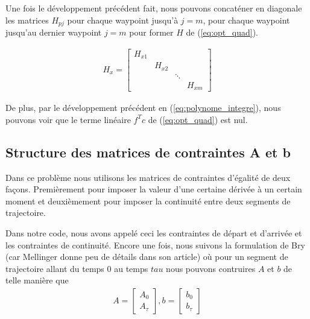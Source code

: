 Une fois le développement précédent fait, nous pouvons concaténer en diagonale les matrices $H_{pj}$ pour chaque waypoint jusqu'à $j=m$, pour chaque waypoint jusqu'au dernier waypoint $j=m$ pour former $H$ de (\ref{eq:opt_quad}).

\begin{align}
H_x=
\begin{bmatrix}
	H_{x1} \\
	&	H_{x2} \\
	&	&		\ddots \\
	&	&		&		H_{xm}
\end{bmatrix}
\end{align}

De plus, par le développement précédent en (\ref{eq:polynome_integre}), nous pouvons voir que le terme linéaire $f^Tc$ de (\ref{eq:opt_quad}) est nul.

\subsection{Structure des matrices de contraintes A et b}

Dans ce problème nous utilisons les matrices de contraintes d'égalité de deux façons. Premièrement pour imposer la valeur d'une certaine dérivée à un certain moment et deuxièmement pour imposer la continuité entre deux segments de trajectoire.

Dans notre code, nous avons appelé ceci les contraintes de départ et d'arrivée et les contraintes de continuité. Encore une fois, nous suivons la formulation de Bry \cite{bry2012control}(car Mellinger donne peu de détails dans son article) où pour un segment de trajectoire allant du temps $0$ au temps $tau$ nous pouvons contruires $A$ et $b$ de telle manière que
\begin{align}
A = \begin{bmatrix} A_0 \\ A_\tau \end{bmatrix}, b = \begin{bmatrix} b_0 \\ b_\tau \end{bmatrix}
\end{align}
